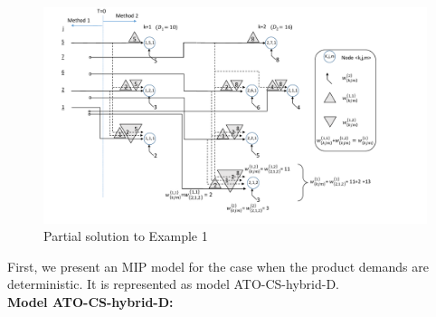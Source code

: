 \documentclass[twoside,onecolumn,12pt,letterpaper]{article}
\begin{document}
\begin{figure}[htbp] 
\centering
\includegraphics[trim={0 1cm 4cm 0},clip,width=\linewidth]{Example1_illustration.pdf}
\caption{Partial solution to Example 1}
\label{fig:example1_illustration}
\end{figure}
\FloatBarrier
First, we present an MIP model for the case when the product demands are deterministic. It is represented as model ATO-CS-hybrid-D.\\
\textbf{Model ATO-CS-hybrid-D:}
\end{document}
